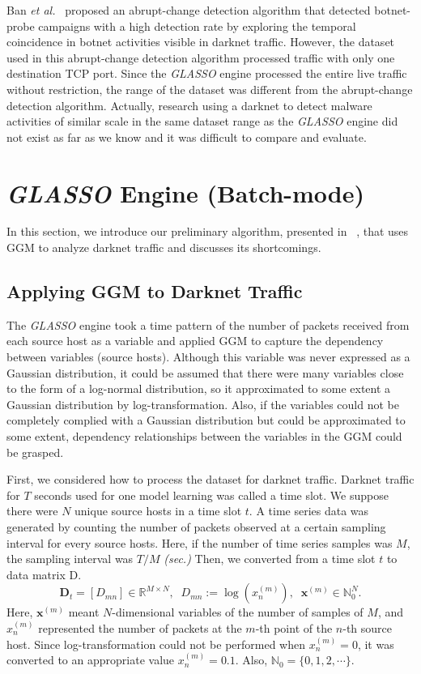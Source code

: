 \documentclass[conference]{IEEEtran}
\begin{document}
Ban {\it et al.}~\cite{Ban} proposed an abrupt-change detection algorithm that detected botnet-probe campaigns with a high detection rate by exploring the temporal coincidence in botnet activities visible in darknet traffic.
However, the dataset used in this abrupt-change detection algorithm processed traffic with only one destination TCP port.
Since the {\it GLASSO} engine processed the entire live traffic without restriction, the range of the dataset was different from the abrupt-change detection algorithm.
Actually, research using a darknet to detect malware activities of similar scale in the same dataset range as the {\it GLASSO} engine did not exist as far as we know and it was difficult to compare and evaluate.




\section{{\it GLASSO} Engine (Batch-mode)}
In this section, we introduce our preliminary algorithm, presented in ~\cite{Han}, that uses GGM to analyze darknet traffic and discusses its shortcomings.


\subsection{Applying GGM to Darknet Traffic}
The {\it GLASSO} engine took a time pattern of the number of packets received from each source host as a variable and applied GGM to capture the dependency between variables (source hosts).
Although this variable was never expressed as a Gaussian distribution, it could be assumed that there were many variables close to the form of a log-normal distribution, so it approximated to some extent a Gaussian distribution by log-transformation.
Also, if the variables could not be completely complied with a Gaussian distribution but could be approximated to some extent, dependency relationships between the variables in the GGM could be grasped.

First, we considered how to process the dataset for darknet traffic.
Darknet traffic for $T$ seconds used for one model learning was called a time slot.
We suppose there were $N$ unique source hosts in a time slot $t$.
A time series data was generated by counting the number of packets observed at a certain sampling interval for every source hosts.
Here, if the number of time series samples was $M$, the sampling interval was $T/M$ {\it (sec.)}
Then, we converted from a time slot $t$ to data matrix D.
\begin{equation*}
\bm{D}_t=[D_{mn}]\in\mathbb{R}^{M \times N},
\;\;D_{mn} := \log(x_n^{(m)}),
\;\;\bm{x}^{(m)}\in\mathbb{N}_0^{N}.
\end{equation*}
Here, $\bm{x}^{(m)}$ meant $N$-dimensional variables of the number of samples of $M$, and $x_n^{(m)}$ represented the number of packets at the $m$-th point of the $n$-th source host.
Since log-transformation could not be performed when $x_n^{(m)}=0$, it was converted to an appropriate value $x_n^{(m)}=0.1$.
Also, $\mathbb{N}_0=\{0,1,2,\cdots\}$.
\end{document}
